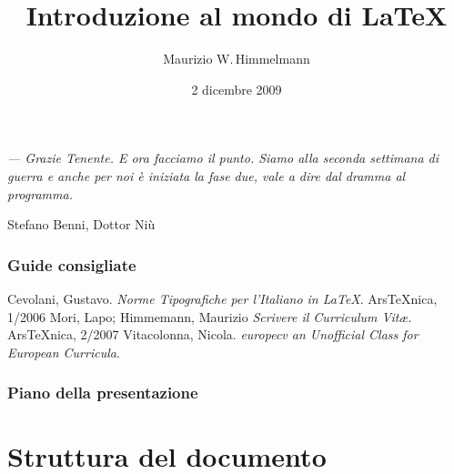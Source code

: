 \documentclass[svgnames,%
	ucs,%
	pdftex]{guitbeamer}
\title{Introduzione al mondo di \LaTeX}
\author[Maurizio W.\,Himmelmann]{Maurizio W.\,Himmelmann}
\date{2 dicembre 2009} %
\begin{document}
\frame{\titlepage}
\begin{frame}
  \itshape
	--- Grazie Tenente. E ora facciamo il punto. Siamo alla
	seconda settimana di guerra e anche per noi \`e iniziata la fase
	due, vale a dire dal dramma al programma. 
	\begin{flushright}\upshape
		Stefano Benni, Dottor Ni\`u
	\end{flushright}
\end{frame}
\begin{frame}
  \frametitle{Guide consigliate}
	\begin{thebibliography}{Wel66}
			Cevolani, Gustavo.
			\newblock\textit{Norme Tipografiche per l'Italiano in \LaTeX}.
			\newblock  Ars\TeX nica, 1/2006
			Mori, Lapo; Himmemann, Maurizio
			\newblock\textit{Scrivere il Curriculum Vit{\ae}}.
			\newblock  Ars\TeX nica, 2/2007
			Vitacolonna, Nicola.
			\newblock\textit{europecv an Unofficial Class for European Curricula}.
	\end{thebibliography}
\end{frame}
\begin{frame}
  \frametitle{Piano della presentazione}
  \tableofcontents
\end{frame}
\section{Struttura del documento}
\end{document}
